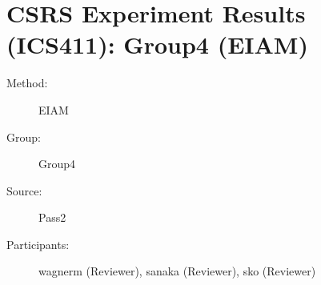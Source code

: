 \chapter {CSRS Experiment Results (ICS411): Group4 (EIAM)}
\small
	  

\begin{description}
\item [Method:] EIAM
\item [Group:] Group4
\item [Source:] Pass2
\item [Participants:] wagnerm (Reviewer), sanaka (Reviewer), sko (Reviewer)
\end{description}
